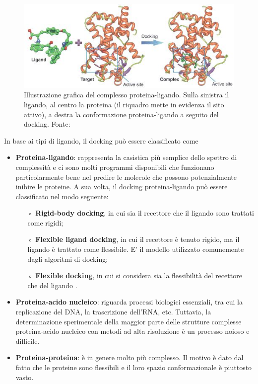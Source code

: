 \begin{figure}[H]
    \centering
    \includegraphics[scale=0.8]{images/chapter1/docking.jpg}
    \caption[Illustrazione grafica del complesso proteina-ligando.]{Illustrazione grafica del complesso proteina-ligando. Sulla sinistra il ligando, al centro la proteina (il riquadro mette in evidenza il sito attivo), a destra la conformazione proteina-ligando a seguito del docking. Fonte: \cite{liao_molecular_2013}}
    \label{fig:molecular_docking}
\end{figure}

In base ai tipi di ligando, il docking può essere classificato come
\begin{itemize}
    \item \textbf{Proteina-ligando}: rappresenta la casistica più semplice dello spettro di complessità e ci sono molti programmi disponibili che funzionano particolarmente bene nel predire le molecole che possono potenzialmente inibire le proteine. 
    A sua volta, il docking proteina-ligando può essere classificato nel modo seguente: 
    \begin{itemize}
        \item[◦] \textbf{Rigid-body docking}, in cui sia il recettore che il ligando sono trattati come rigidi; 
        \item[◦] \textbf{Flexible ligand docking}, in cui il recettore è tenuto rigido, ma il ligando è trattato come flessibile. E' il modello  utilizzato comunemente dagli algoritmi di docking;
        \item[◦] \textbf{Flexible docking}, in cui si considera sia la flessibilità del recettore che del ligando \cite{roy_chapter_2015}.
    \end{itemize}
    \item \textbf{Proteina-acido nucleico}: riguarda processi biologici essenziali, tra cui la replicazione del DNA, la trascrizione dell'RNA, etc. Tuttavia, la determinazione sperimentale della maggior parte delle strutture complesse proteina-acido nucleico con metodi ad alta risoluzione è un processo noioso e difficile.
    \item \textbf{Proteina-proteina}: è in genere molto più complesso. Il motivo è dato dal fatto che le proteine sono flessibili e il loro spazio conformazionale è piuttosto vasto.
\end{itemize}

